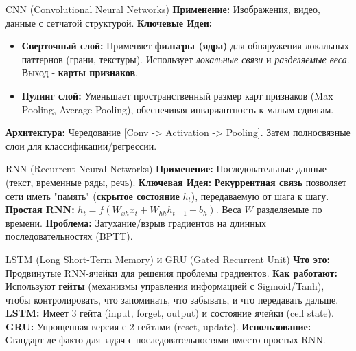 \begin{myblock}{CNN (Convolutional Neural Networks)}
    \textbf{Применение:} Изображения, видео, данные с сетчатой структурой.
    \textbf{Ключевые Идеи:}
    \begin{itemize}
        \item \textbf{Сверточный слой:} Применяет \textbf{фильтры (ядра)} для обнаружения локальных паттернов (грани, текстуры). Использует \textit{локальные связи} и \textit{разделяемые веса}. Выход - \textbf{карты признаков}.
        \item \textbf{Пулинг слой:} Уменьшает пространственный размер карт признаков (Max Pooling, Average Pooling), обеспечивая инвариантность к малым сдвигам.
    \end{itemize}
    \textbf{Архитектура:} Чередование [Conv -> Activation -> Pooling]. Затем полносвязные слои для классификации/регрессии.
\end{myblock}

\begin{myblock}{RNN (Recurrent Neural Networks)}
    \textbf{Применение:} Последовательные данные (текст, временные ряды, речь).
    \textbf{Ключевая Идея:} \textbf{Рекуррентная связь} позволяет сети иметь "память" (\textbf{скрытое состояние} $h_t$), передаваемую от шага к шагу.
    \textbf{Простая RNN:} $h_t = f(W_{xh} x_t + W_{hh} h_{t-1} + b_h)$. Веса $W$ разделяемые по времени.
    \textbf{Проблема:} Затухание/взрыв градиентов на длинных последовательностях (BPTT).
\end{myblock}

\begin{myblock}{LSTM (Long Short-Term Memory) и GRU (Gated Recurrent Unit)}
    \textbf{Что это:} Продвинутые RNN-ячейки для решения проблемы градиентов.
    \textbf{Как работают:} Используют \textbf{гейты} (механизмы управления информацией с Sigmoid/Tanh), чтобы контролировать, что запоминать, что забывать, и что передавать дальше.
    \textbf{LSTM:} Имеет 3 гейта (input, forget, output) и состояние ячейки (cell state).
    \textbf{GRU:} Упрощенная версия с 2 гейтами (reset, update).
    \textbf{Использование:} Стандарт де-факто для задач с последовательностями вместо простых RNN.
\end{myblock}

